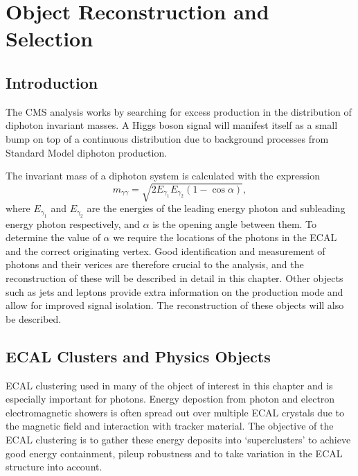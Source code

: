 \chapter{Object Reconstruction and Selection}
\label{chap:object_reco}

\section{Introduction}
The CMS \Hgg analysis works by searching for excess production in the distribution of diphoton invariant masses. A Higgs boson signal will manifest itself as a small bump on top of a continuous distribution due to background processes from Standard Model diphoton production.

The invariant mass of a diphoton system is calculated with the expression
\begin{equation}
    m_{\gamma\gamma} = \sqrt{2E_{\gamma_1}E_{\gamma_2}(1-\cos{\alpha})},
\end{equation}
where $E_{\gamma_1}$ and $E_{\gamma_2}$ are the energies of the leading energy photon and subleading energy photon respectively, and $\alpha$ is the opening angle between them. 
To determine the value of $\alpha$ we require the locations of the photons in the ECAL and the correct originating vertex. 
Good identification and measurement of photons and their verices are therefore crucial to the analysis, and the reconstruction of these will be described in detail in this chapter. 
Other objects such as jets and leptons provide extra information on the production mode and allow for improved signal isolation. The reconstruction of these objects will also be described.

\section{ECAL Clusters and Physics Objects}
ECAL clustering used in many of the object of interest in this chapter and is especially important for photons. 
Energy depostion from photon and electron electromagnetic showers is often spread out over multiple ECAL crystals due to the magnetic field and interaction with tracker material. 
The objective of the ECAL clustering is to gather these energy deposits into `superclusters' to achieve good energy containment, pileup robustness and to take variation in the ECAL structure into account.

